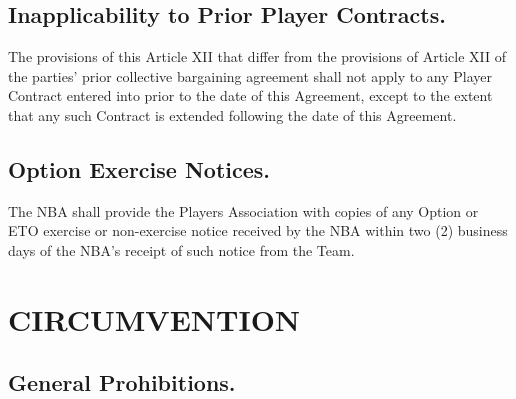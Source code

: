 \documentclass[
]{book}
\begin{document}
\hypertarget{inapplicability-to-prior-player-contracts.}{%
\section{Inapplicability to Prior Player Contracts.}\label{inapplicability-to-prior-player-contracts.}}

The provisions of this Article XII that differ from the provisions of Article XII of the parties' prior collective bargaining agreement shall not apply to any Player Contract entered into prior to the date of this Agreement, except to the extent that any such Contract is extended following the date of this Agreement.

\hypertarget{option-exercise-notices.}{%
\section{Option Exercise Notices.}\label{option-exercise-notices.}}

The NBA shall provide the Players Association with copies of any Option or ETO exercise or non-exercise notice received by the NBA within two (2) business days of the NBA's receipt of such notice from the Team.

\hypertarget{circumvention}{%
\chapter{CIRCUMVENTION}\label{circumvention}}

\hypertarget{general-prohibitions.}{%
\section{General Prohibitions.}\label{general-prohibitions.}}
\end{document}
